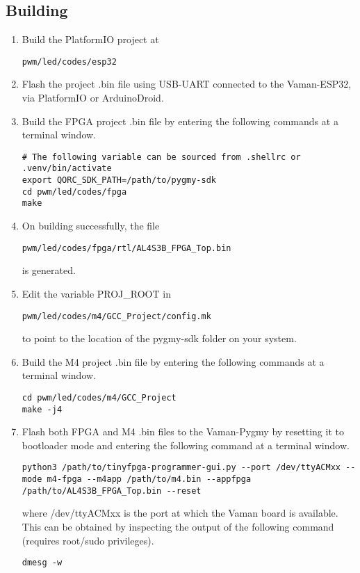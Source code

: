 \subsection{Building}
\begin{enumerate}
    \item Build the PlatformIO project at
    \begin{lstlisting}
pwm/led/codes/esp32
    \end{lstlisting}
    \item Flash the project .bin file using USB-UART connected to the 
    Vaman-ESP32, via PlatformIO or ArduinoDroid.
    \item Build the FPGA project .bin file by entering the following commands at
    a terminal window.
    \begin{lstlisting}
# The following variable can be sourced from .shellrc or .venv/bin/activate
export QORC_SDK_PATH=/path/to/pygmy-sdk
cd pwm/led/codes/fpga
make
    \end{lstlisting}
    \item On building successfully, the file
    \begin{lstlisting}
pwm/led/codes/fpga/rtl/AL4S3B_FPGA_Top.bin
    \end{lstlisting}
    is generated.
    \item Edit the variable PROJ\_ROOT in
    \begin{lstlisting}
pwm/led/codes/m4/GCC_Project/config.mk
    \end{lstlisting}
    to point to the location of the pygmy-sdk folder on your system.
    \item Build the M4 project .bin file by entering the following commands at a
    terminal window.
    \begin{lstlisting}
cd pwm/led/codes/m4/GCC_Project
make -j4
    \end{lstlisting}
    \item Flash both FPGA and M4 .bin files to the Vaman-Pygmy by resetting it
    to bootloader mode and entering the following command at a terminal window.
    \begin{lstlisting}
python3 /path/to/tinyfpga-programmer-gui.py --port /dev/ttyACMxx --mode m4-fpga --m4app /path/to/m4.bin --appfpga /path/to/AL4S3B_FPGA_Top.bin --reset
    \end{lstlisting}
    where /dev/ttyACMxx is the port at which the Vaman board is available. This
    can be obtained by inspecting the output of the following command (requires
    root/sudo privileges).
    \begin{lstlisting}
dmesg -w
    \end{lstlisting}
\end{enumerate}

